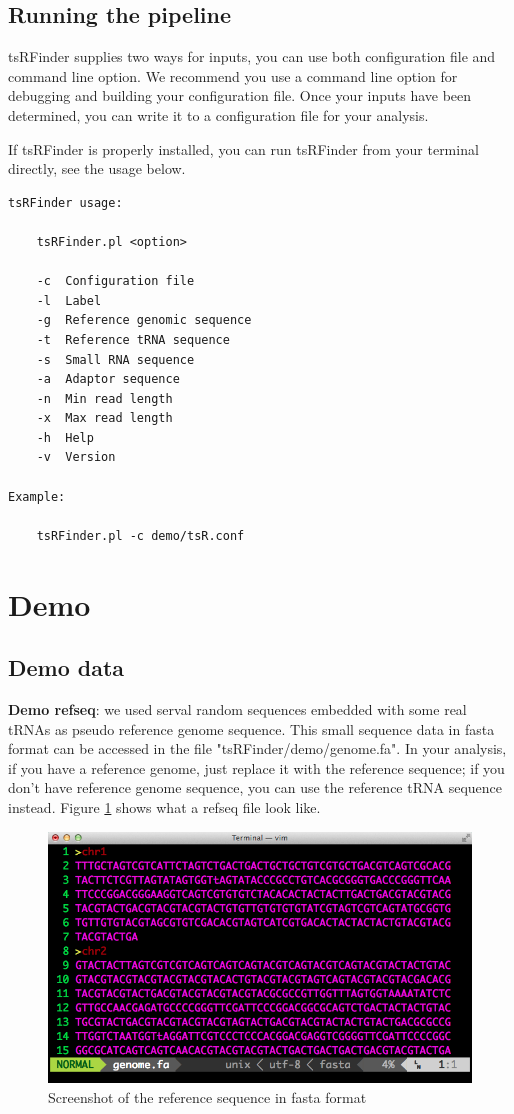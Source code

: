 \documentclass[11pt, a4paper]{article}
\begin{document}
\subsection{Running the pipeline}

tsRFinder supplies two ways for inputs, you can use both configuration file and command line option. We recommend you use a command line option for debugging and building your configuration file. Once your inputs have been determined, you can write it to a configuration file for your analysis.

If tsRFinder is properly installed, you can run tsRFinder from your terminal directly, see the usage below.

{\small \begin{verbatim}
tsRFinder usage:

    tsRFinder.pl <option>

    -c  Configuration file
    -l  Label
    -g  Reference genomic sequence
    -t  Reference tRNA sequence
    -s  Small RNA sequence
    -a  Adaptor sequence
    -n  Min read length
    -x  Max read length
    -h  Help
    -v  Version

Example:

    tsRFinder.pl -c demo/tsR.conf
\end{verbatim}}

\section{Demo}

\subsection{Demo data}

\textbf{Demo refseq}: we used serval random sequences embedded with some real tRNAs as pseudo reference genome sequence. This small sequence data in fasta format can be accessed in the file "tsRFinder/demo/genome.fa". In your analysis, if you have a reference genome, just replace it with the reference sequence; if you don't have reference genome sequence, you can use the reference tRNA sequence instead. Figure \ref{refseq} shows what a refseq file look like.

\begin{figure}[htbp]
\begin{center}
\includegraphics[width=12cm]{refseq.png}
\caption{Screenshot of the reference sequence in fasta format} 
\label{refseq}
\end{center}
\end{figure}
\end{document}
